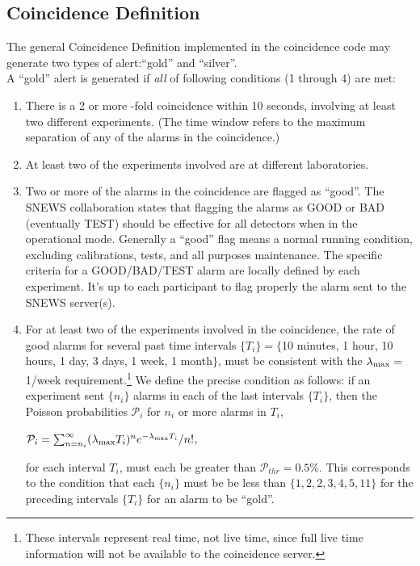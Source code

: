 \documentclass{article}
\begin{document}
\subsection{Coincidence Definition}

The general Coincidence Definition implemented in the coincidence code
may generate two types of alert:``gold'' and ``silver''.\\
A ``gold'' alert is generated if \textit{all} of
following conditions (1 through 4) are met:

\begin{enumerate}

\item There is a 2 or more -fold coincidence within 10 seconds,
involving at least two different experiments. 
(The time window refers to the maximum
separation of any of the alarms in the coincidence.)

\item At least two of the experiments involved
are at different laboratories.

\item Two or more of the alarms in the coincidence
are flagged as ``good''.  The SNEWS collaboration states
that flagging the alarms as GOOD or BAD (eventually TEST) should be effective 
for all detectors when in the operational  mode. 
Generally a ``good'' flag means a normal running condition, excluding 
calibrations, tests, and all purposes maintenance.  
The specific criteria for a GOOD/BAD/TEST alarm are locally defined by
each experiment. 
It's up to each participant to flag properly the alarm sent to the SNEWS 
server(s).  
 
\item For at least two of the experiments involved in the coincidence,
the rate of good alarms for several past time intervals $\{T_i\}=\{$10 minutes, 1
hour, 10 hours, 1 day, 3 days, 1 week, 1 month$\}$, must be consistent with
the $\lambda_{\rm{max}}=$1/week requirement.\footnote{These intervals
represent real time, not live time, since full live time information
will not be available to the coincidence server.}
We define the precise condition 
as follows:  
if an experiment sent $\{n_i\}$ alarms in 
each of the last intervals $\{T_i\}$,
then the Poisson probabilities $\mathcal{P}_i$ for $n_i$ or more
alarms in $T_i$,

$\mathcal{P}_i=\sum_{n=n_i}^{\infty}(\lambda_{\rm{max}} T_i)^{n}e^{-\lambda_{\rm{max}} T_i}/n!$,

for each interval $T_i$, must each be greater than $\mathcal{P}_{thr}=0.5$\%.
This corresponds to the condition that each $\{n_i\}$ must be be less
than $\{1,2,2,3,4,5,11\}$ for the preceding intervals $\{T_i\}$ for an
alarm to be ``gold''.

\end{enumerate}
\end{document}
